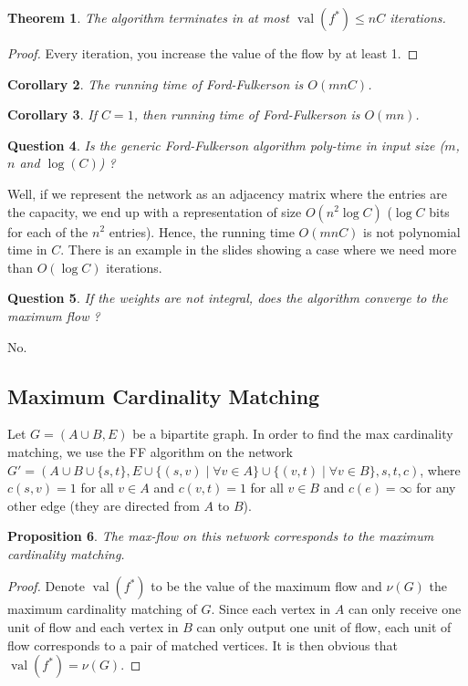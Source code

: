 \documentclass{tufte-handout}
\newtheorem{thm}{Theorem}
\newtheorem{cor}[thm]{Corollary}
\newtheorem{prop}[thm]{Proposition}
\newtheorem{quest}[thm]{Question}
\theoremstyle{definition}
\theoremstyle{remark}
\DeclareMathOperator{\val}{val}
\begin{document}
\begin{thm}
	The algorithm terminates in at most $\val(f^*) \leq nC$ iterations.
\end{thm}
\begin{proof}
	Every iteration, you increase the value of the flow by at least 1.
\end{proof}
\begin{cor}
	The running time of Ford-Fulkerson is $O(mnC)$.
\end{cor}
\begin{cor}
	If $C = 1$, then running time of Ford-Fulkerson is $O(mn)$.
\end{cor}
\begin{quest}
	Is the generic Ford-Fulkerson algorithm poly-time in input size ($m$, $n$ and $\log(C)$) ?
\end{quest}
Well, if we represent the network as an adjacency matrix where the entries are the capacity, we end up with a representation of size $O(n^2\log C)$ ($\log C$ bits for each of the $n^2$ entries). Hence, the running time $O(mnC)$ is not polynomial time in $C$. There is an example in the slides showing a case where we need more than $O(\log C)$ iterations.

\begin{quest}
	If the weights are not integral, does the algorithm converge to the maximum flow ?
\end{quest}
No.
\subsection{Maximum Cardinality Matching}
Let $G = (A\cup B, E)$ be a bipartite graph. In order to find the max cardinality matching, we use the FF algorithm on the network $G' = (A\cup B \cup \{s,t\}, E \cup \{(s,v) \mid \forall v \in A\} \cup \{(v,t) \mid \forall v \in B\}, s, t, c)$, where  $c(s,v) = 1$ for all $v \in A$ and $c(v,t) = 1$ for all $v \in B$ and $c(e) = \infty$ for any other edge (they are directed from $A$ to $B$).
\begin{prop}
	The max-flow on this network corresponds to the maximum cardinality matching.
\end{prop}
\begin{proof}
	Denote $\val(f^*)$ to be the value of the maximum flow and $\nu(G)$ the maximum cardinality matching of $G$. Since each vertex in $A$ can only receive one unit of flow and each vertex in $B$ can only output one unit of flow, each unit of flow corresponds to a pair of matched vertices. It is then obvious that $\val(f^*) = \nu(G)$.
\end{proof}
\end{document}
